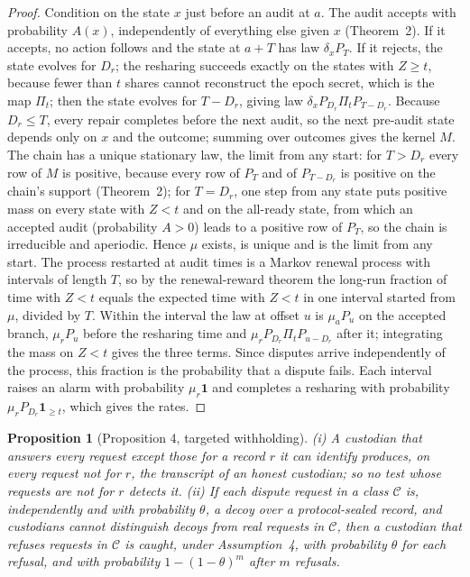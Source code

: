 \documentclass[11pt]{article}
\newtheorem*{propositionS}{Proposition}
\begin{document}
\begin{proof}
Condition on the state $x$ just before an audit at $a$. The audit accepts with probability $A(x)$, independently of everything else given $x$ (Theorem~2). If it accepts, no action follows and the state at $a+T$ has law $\delta_xP_T$. If it rejects, the state evolves for $D_r$; the resharing succeeds exactly on the states with $Z\ge t$, because fewer than $t$ shares cannot reconstruct the epoch secret, which is the map $\Pi_t$; then the state evolves for $T-D_r$, giving law $\delta_xP_{D_r}\Pi_t P_{T-D_r}$. Because $D_r\le T$, every repair completes before the next audit, so the next pre-audit state depends only on $x$ and the outcome; summing over outcomes gives the kernel $M$. The chain has a unique stationary law, the limit from any start: for $T>D_r$ every row of $M$ is positive, because every row of $P_T$ and of $P_{T-D_r}$ is positive on the chain's support (Theorem~2); for $T=D_r$, one step from any state puts positive mass on every state with $Z<t$ and on the all-ready state, from which an accepted audit (probability $A>0$) leads to a positive row of $P_T$, so the chain is irreducible and aperiodic. Hence $\mu$ exists, is unique and is the limit from any start. The process restarted at audit times is a Markov renewal process with intervals of length $T$, so by the renewal-reward theorem the long-run fraction of time with $Z<t$ equals the expected time with $Z<t$ in one interval started from $\mu$, divided by $T$. Within the interval the law at offset $u$ is $\mu_aP_u$ on the accepted branch, $\mu_rP_u$ before the resharing time and $\mu_rP_{D_r}\Pi_t P_{u-D_r}$ after it; integrating the mass on $Z<t$ gives the three terms. Since disputes arrive independently of the process, this fraction is the probability that a dispute fails. Each interval raises an alarm with probability $\mu_r\mathbf{1}$ and completes a resharing with probability $\mu_rP_{D_r}\mathbf{1}_{\ge t}$, which gives the rates.
\end{proof}

\begin{propositionS}[Proposition 4, targeted withholding]
(i) A custodian that answers every request except those for a record $r$ it can identify produces, on every request not for $r$, the transcript of an honest custodian; so no test whose requests are not for $r$ detects it. (ii) If each dispute request in a class $\mathcal{C}$ is, independently and with probability $\theta$, a decoy over a protocol-sealed record, and custodians cannot distinguish decoys from real requests in $\mathcal{C}$, then a custodian that refuses requests in $\mathcal{C}$ is caught, under Assumption~4, with probability $\theta$ for each refusal, and with probability $1-(1-\theta)^m$ after $m$ refusals.
\end{propositionS}
\end{document}
